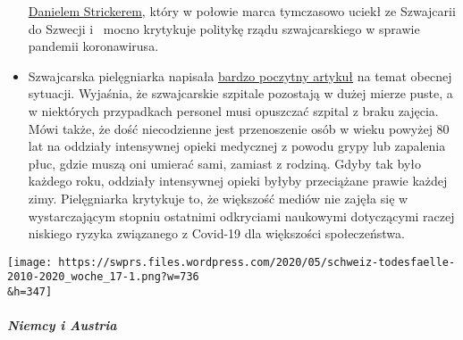 \begin{itemize}
  \href{https://www.youtube.com/user/timturpis/videos}{Danielem
  Strickerem}, który w połowie marca tymczasowo uciekł ze Szwajcarii do
  Szwecji i~ mocno krytykuje politykę rządu szwajcarskiego w sprawie
  pandemii koronawirusa.
\item
  Szwajcarska pielęgniarka napisała
  \href{https://www.facebook.com/simone.christinat/posts/10221314943115981}{bardzo
  poczytny artykuł} na temat obecnej sytuacji. Wyjaśnia, że szwajcarskie
  szpitale pozostają w dużej mierze puste, a w niektórych przypadkach
  personel musi opuszczać szpital z braku zajęcia. Mówi także, że dość
  niecodzienne jest przenoszenie osób w wieku powyżej 80 lat na oddziały
  intensywnej opieki medycznej z powodu grypy lub zapalenia płuc, gdzie
  muszą oni umierać sami, zamiast z rodziną. Gdyby tak było każdego
  roku, oddziały intensywnej opieki byłyby przeciążane prawie każdej
  zimy. Pielęgniarka krytykuje to, że większość mediów nie zajęła się w
  wystarczającym stopniu ostatnimi odkryciami naukowymi dotyczącymi
  raczej niskiego ryzyka związanego z Covid-19 dla większości
  społeczeństwa.
\end{itemize}

\texttt{[image: https://swprs.files.wordpress.com/2020/05/schweiz-todesfaelle-2010-2020\_woche\_17-1.png?w=736\\\&h=347]}

\hypertarget{niemcy-i-austria}{%
\subparagraph{\texorpdfstring{\textbf{Niemcy i
Austria}}{Niemcy i Austria}}\label{niemcy-i-austria}}

